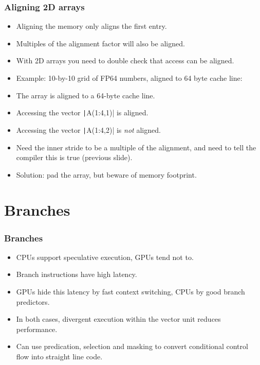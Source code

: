 \documentclass{beamer}
\begin{document}
\begin{frame}
\frametitle{Aligning 2D arrays}
\begin{itemize}
  \item Aligning the memory only aligns the first entry.
  \item Multiples of the alignment factor will also be aligned.
  \item With 2D arrays you need to double check that access can be aligned.
  \item Example: 10-by-10 grid of FP64 numbers, aligned to 64 byte cache line:
\end{itemize}

\begin{adjustbox}{max width={\textwidth}}
\end{adjustbox}

\begin{itemize}
  \item The array is aligned to a 64-byte cache line.
  \item Accessing the vector \texttt|A(1:4,1)| is aligned.
  \item Accessing the vector \texttt|A(1:4,2)| is \emph{not} aligned.
  \item Need the inner stride to be a multiple of the alignment, and need to tell the compiler this is true (previous slide).
  \item Solution: pad the array, but beware of memory footprint.
\end{itemize}

\end{frame}
\section{Branches}
\begin{frame}
\frametitle{Branches}
\begin{itemize}
  \item CPUs support speculative execution, GPUs tend not to.
  \item Branch instructions have high latency.
  \item GPUs hide this latency by fast context switching, CPUs by good branch predictors.
  \item In both cases, divergent execution within the vector unit reduces performance.
  \item Can use predication, selection and masking to convert conditional control flow into straight line code.
\end{itemize}
\end{frame}
\end{document}
